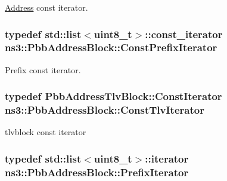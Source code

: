 \hyperlink{classns3_1_1Address}{Address} const iterator. 

\subsubsection[{\texorpdfstring{Const\+Prefix\+Iterator}{ConstPrefixIterator}}]{\setlength{\rightskip}{0pt plus 5cm}typedef {\bf std\+::list}$<$uint8\+\_\+t$>$\+::const\+\_\+iterator {\bf ns3\+::\+Pbb\+Address\+Block\+::\+Const\+Prefix\+Iterator}}\hypertarget{classns3_1_1PbbAddressBlock_ac99d39169c106574b8c2aa51646bf404}{}\label{classns3_1_1PbbAddressBlock_ac99d39169c106574b8c2aa51646bf404}


Prefix const iterator. 

\subsubsection[{\texorpdfstring{Const\+Tlv\+Iterator}{ConstTlvIterator}}]{\setlength{\rightskip}{0pt plus 5cm}typedef {\bf Pbb\+Address\+Tlv\+Block\+::\+Const\+Iterator} {\bf ns3\+::\+Pbb\+Address\+Block\+::\+Const\+Tlv\+Iterator}}\hypertarget{classns3_1_1PbbAddressBlock_aade1f33dd044ed386c19efdaf6036e93}{}\label{classns3_1_1PbbAddressBlock_aade1f33dd044ed386c19efdaf6036e93}


tlvblock const iterator 

\subsubsection[{\texorpdfstring{Prefix\+Iterator}{PrefixIterator}}]{\setlength{\rightskip}{0pt plus 5cm}typedef {\bf std\+::list}$<$uint8\+\_\+t$>$\+::iterator {\bf ns3\+::\+Pbb\+Address\+Block\+::\+Prefix\+Iterator}}\hypertarget{classns3_1_1PbbAddressBlock_a0c36abcfa36790bcbd156d036e103fa4}{}\label{classns3_1_1PbbAddressBlock_a0c36abcfa36790bcbd156d036e103fa4}


